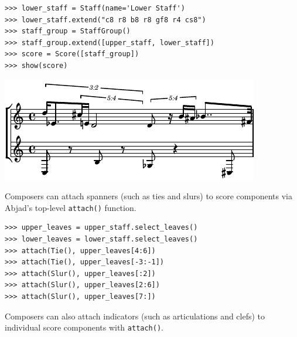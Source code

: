 \documentclass{article}
\begin{document}
\begin{lstlisting}
>>> lower_staff = Staff(name='Lower Staff')
>>> lower_staff.extend("c8 r8 b8 r8 gf8 r4 cs8")
>>> staff_group = StaffGroup()
>>> staff_group.extend([upper_staff, lower_staff])
>>> score = Score([staff_group])
>>> show(score)
\end{lstlisting}
\includegraphics{assets/lilypond-8d72e9a5aced38c13d509aea16c53ca6.pdf}

Composers can attach spanners (such as ties and slurs) to score components via
Abjad's top-level \texttt{attach()} function.

\begin{lstlisting}
>>> upper_leaves = upper_staff.select_leaves()
>>> lower_leaves = lower_staff.select_leaves()
>>> attach(Tie(), upper_leaves[4:6])
>>> attach(Tie(), upper_leaves[-3:-1])
>>> attach(Slur(), upper_leaves[:2])
>>> attach(Slur(), upper_leaves[2:6])
>>> attach(Slur(), upper_leaves[7:])
\end{lstlisting}

Composers can also attach indicators (such as articulations and clefs) to
individual score components with \texttt{attach()}.

\end{document}

